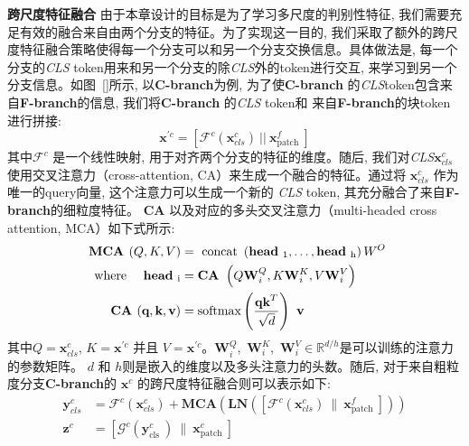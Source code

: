 \textbf{跨尺度特征融合}
由于本章设计的目标是为了学习多尺度的判别性特征, 我们需要充足有效的融合来自由两个分支的特征。为了实现这一目的, 我们采取了额外的跨尺度特征融合策略使得每一个分支可以和另一个分支交换信息。具体做法是, 每一个分支的\textit{CLS} token用来和另一个分支的除\textit{CLS}外的token进行交互, 来学习到另一个分支信息。如图~\ref{}所示, 以\textbf{C-branch}为例, 为了使\textbf{C-branch} 的\textit{CLS}token包含来自\textbf{F-branch}的信息, 我们将\textbf{C-branch} 的\textit{CLS} token和 来自\textbf{F-branch}的块token进行拼接:
\begin{equation}
    \mathbf{x}^{\prime c}=\left[\mathcal{F}^{c}\left(\mathbf{x}_{c l s}^{c}\right) \ || \ \mathbf{x}_{\text {patch }}^{f}\right]
\end{equation}
其中$\mathcal{F}^c$ 是一个线性映射, 用于对齐两个分支的特征的维度。随后, 我们对\textit{CLS}$\mathbf{x}_{cls}^c$使用交叉注意力（cross-attention, CA）来生成一个融合的特征。通过将 $\mathbf{x}_{cls}^c$ 作为唯一的query向量, 这个注意力可以生成一个新的 \textit{CLS} token, 其充分融合了来自\textbf{F-branch}的细粒度特征。  \textbf{CA} 以及对应的多头交叉注意力（multi-headed cross attention, MCA）如下式所示:
\begin{equation}
    \begin{aligned}
    \textbf{ MCA }(Q, K, V) &=\text { concat }\left(\textbf{head}_{\ 1}, \ldots, \textbf{head}_{\ \mathrm{h}}\right) W^{O} \\
    \text { where \quad \textbf{head}}_{\ \mathrm{i}} &= \textbf{CA }\left(Q \mathbf{W}_{i}^{Q}, K \mathbf{W}_{i}^{K}, V \mathbf{W}_{i}^{V}\right) \\
    \textbf{ CA }(\textbf{q}, \textbf{k}, \textbf{v})  &= \operatorname{softmax}\left(\frac{\textbf{q} \textbf{k}^{T}}{\sqrt{d}}\right) \textbf{ v}
    \end{aligned}
\end{equation}
其中$Q = \mathbf{x}_{cls}^{c}$, $K = \mathbf{x}^{\prime c}$ 并且 $V = \mathbf{x}^{\prime c}$。$\mathbf{W}^Q_i$,~$\mathbf{W}^K_i$,~$\mathbf{W}^V_i \in \mathbb{R}^{d/h}$是可以训练的注意力的参数矩阵。 $d$ 和 $h$则是嵌入的维度以及多头注意力的头数。随后, 对于来自粗粒度分支\textbf{C-branch}的 $\mathbf{x}^c$ 的跨尺度特征融合则可以表示如下:
\begin{equation}
    \begin{aligned}
\mathbf{y}_{c l s}^{c} &= \mathcal{F}^{c}\left(\mathbf{x}_{c l s}^{c}\right)+\textbf{MCA}\left(\textbf{LN}\left(\left[\mathcal{F}^{c}\left(\mathbf{x}_{c l s}^{c}\right) \ \| \ \mathbf{x}_{\text {patch }}^{f}\right]\right)\right) \\
\mathbf{z}^{c} &=\left[\mathcal{G}^{c}\left(\mathbf{y}_{\text {cls }}^{c}\right) \ \| \ \mathbf{x}_{\text {patch }}^{c}\right]
\end{aligned}
\end{equation}
